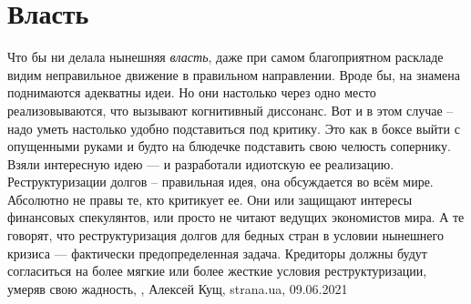  
 
 
 
 
\chapter{Власть}

Что бы ни делала нынешняя \emph{власть}, даже при самом благоприятном раскладе
видим неправильное движение в правильном направлении.  Вроде бы, на знамена
поднимаются адекватны идеи. Но они настолько через одно место реализовываются,
что вызывают когнитивный диссонанс.  Вот и в этом случае – надо уметь настолько
удобно подставиться под критику.  Это как в боксе выйти с опущенными руками и
будто на блюдечке подставить свою челюсть сопернику. Взяли интересную идею — и
разработали идиотскую ее реализацию.  Реструктуризации долгов – правильная
идея, она обсуждается во всём мире. Абсолютно не правы те, кто критикует ее.
Они или защищают интересы финансовых спекулянтов, или просто не читают ведущих
экономистов мира. А те говорят, что реструктуризация долгов для бедных стран в
условии нынешнего кризиса — фактически предопределенная задача. Кредиторы
должны будут согласиться на более мягкие или более жесткие условия
реструктуризации, умеряв свою жадность,
, Алексей Кущ, strana.ua, 09.06.2021


